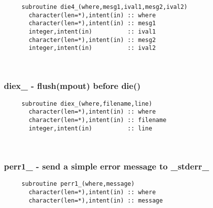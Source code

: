 \begin{verbatim} 
     subroutine die4_(where,mesg1,ival1,mesg2,ival2)
       character(len=*),intent(in) :: where
       character(len=*),intent(in) :: mesg1
       integer,intent(in)          :: ival1
       character(len=*),intent(in) :: mesg2
       integer,intent(in)          :: ival2
 \end{verbatim}%
 
 
\mbox{}\hrulefill\ 

  \subsubsection{diex\_ - flush(mpout) before die()}

\begin{verbatim} 
     subroutine diex_(where,filename,line)
       character(len=*),intent(in) :: where
       character(len=*),intent(in) :: filename
       integer,intent(in)          :: line
 \end{verbatim}%
 
 
\mbox{}\hrulefill\ 
 
  \subsubsection{perr1\_ - send a simple error message to \_stderr\_}

\begin{verbatim} 
     subroutine perr1_(where,message)
       character(len=*),intent(in) :: where
       character(len=*),intent(in) :: message
 \end{verbatim}%
 
 
